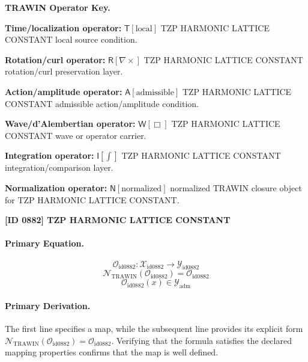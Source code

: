 \par\vspace{0.45\baselineskip}
\noindent\begin{minipage}[t]{\linewidth}
\begingroup
\small
\raggedright
\textbf{TRAWIN Operator Key.}\par
\noindent\textbf{Time/localization operator:} $\mathsf{T}\!\left[\mathrm{local}\right]$ TZP HARMONIC LATTICE CONSTANT local source condition.\par
\noindent\textbf{Rotation/curl operator:} $\mathsf{R}\!\left[\nabla\times\right]$ TZP HARMONIC LATTICE CONSTANT rotation/curl preservation layer.\par
\noindent\textbf{Action/amplitude operator:} $\mathsf{A}\!\left[\mathrm{admissible}\right]$ TZP HARMONIC LATTICE CONSTANT admissible action/amplitude condition.\par
\noindent\textbf{Wave/d'Alembertian operator:} $\mathsf{W}\!\left[\Box\right]$ TZP HARMONIC LATTICE CONSTANT wave or operator carrier.\par
\noindent\textbf{Integration operator:} $\mathsf{I}\!\left[\int\right]$ TZP HARMONIC LATTICE CONSTANT integration/comparison layer.\par
\noindent\textbf{Normalization operator:} $\mathsf{N}\!\left[\mathrm{normalized}\right]$ normalized TRAWIN closure object for TZP HARMONIC LATTICE CONSTANT.\par
\endgroup
\end{minipage}

\clearpage
\noindent\textbf{[ID 0882] TZP HARMONIC LATTICE CONSTANT}\par
\vspace{0.35em}
\paragraph{Primary Equation.}
\[
\mathcal{O}_{\mathrm{id0882}}:\mathcal{X}_{\mathrm{id0882}}\longrightarrow\mathcal{Y}_{\mathrm{id0882}}
\]
\[
\mathcal{N}_{\mathrm{TRAWIN}}(\mathcal{O}_{\mathrm{id0882}})=\mathcal{O}_{\mathrm{id0882}}
\]
\[
\mathcal{O}_{\mathrm{id0882}}(x)\in\mathcal{Y}_{\mathrm{adm}}
\]

\paragraph{Primary Derivation.}
The first line specifies a map, while the subsequent line provides its explicit form \( \mathcal{N}_{\mathrm{TRAWIN}}(\mathcal{O}_{\mathrm{id0882}})=\mathcal{O}_{\mathrm{id0882}} \). Verifying that the formula satisfies the declared mapping properties confirms that the map is well defined.
